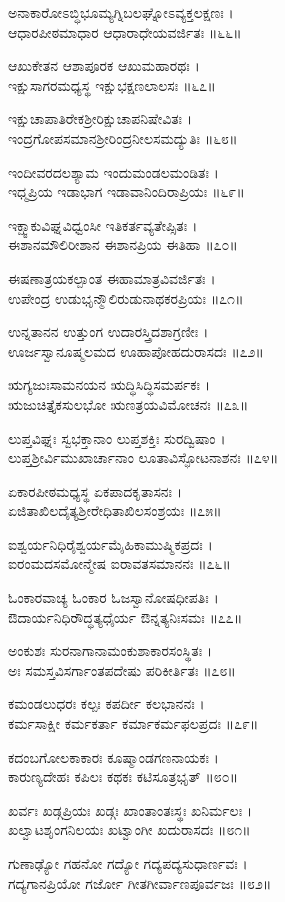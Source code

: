 ಅನಾಕಾರೋಽಬ್ಧಿಭೂಮ್ಯಗ್ನಿಬಲಘ್ನೋಽವ್ಯಕ್ತಲಕ್ಷಣಃ ।\\
ಆಧಾರಪೀಠಮಾಧಾರ ಆಧಾರಾಧೇಯವರ್ಜಿತಃ ॥೬೬॥

ಆಖುಕೇತನ ಆಶಾಪೂರಕ ಆಖುಮಹಾರಥಃ ।\\
ಇಕ್ಷುಸಾಗರಮಧ್ಯಸ್ಥ ಇಕ್ಷುಭಕ್ಷಣಲಾಲಸಃ ॥೬೭॥

ಇಕ್ಷುಚಾಪಾತಿರೇಕಶ್ರೀರಿಕ್ಷುಚಾಪನಿಷೇವಿತಃ ।\\
ಇಂದ್ರಗೋಪಸಮಾನಶ್ರೀರಿಂದ್ರನೀಲಸಮದ್ಯುತಿಃ ॥೬೮॥

ಇಂದೀವರದಲಶ್ಯಾಮ ಇಂದುಮಂಡಲಮಂಡಿತಃ ।\\
ಇಧ್ಮಪ್ರಿಯ ಇಡಾಭಾಗ ಇಡಾವಾನಿಂದಿರಾಪ್ರಿಯಃ ॥೬೯॥

ಇಕ್ಷ್ವಾಕುವಿಘ್ನವಿಧ್ವಂಸೀ ಇತಿಕರ್ತವ್ಯತೇಪ್ಸಿತಃ ।\\
ಈಶಾನಮೌಲಿರೀಶಾನ ಈಶಾನಪ್ರಿಯ ಈತಿಹಾ ॥೭೦॥

ಈಷಣಾತ್ರಯಕಲ್ಪಾಂತ ಈಹಾಮಾತ್ರವಿವರ್ಜಿತಃ ।\\
ಉಪೇಂದ್ರ ಉಡುಭೃನ್ಮೌಲಿರುಡುನಾಥಕರಪ್ರಿಯಃ ॥೭೧॥

ಉನ್ನತಾನನ ಉತ್ತುಂಗ ಉದಾರಸ್ತ್ರಿದಶಾಗ್ರಣೀಃ ।\\
ಊರ್ಜಸ್ವಾನೂಷ್ಮಲಮದ ಊಹಾಪೋಹದುರಾಸದಃ ॥೭೨॥

ಋಗ್ಯಜುಃಸಾಮನಯನ ಋದ್ಧಿಸಿದ್ಧಿಸಮರ್ಪಕಃ ।\\
ಋಜುಚಿತ್ತೈಕಸುಲಭೋ ಋಣತ್ರಯವಿಮೋಚನಃ ॥೭೩॥

ಲುಪ್ತವಿಘ್ನಃ ಸ್ವಭಕ್ತಾನಾಂ ಲುಪ್ತಶಕ್ತಿಃ ಸುರದ್ವಿಷಾಂ ।\\
ಲುಪ್ತಶ್ರೀರ್ವಿಮುಖಾರ್ಚಾನಾಂ ಲೂತಾವಿಸ್ಫೋಟನಾಶನಃ ॥೭೪॥

ಏಕಾರಪೀಠಮಧ್ಯಸ್ಥ ಏಕಪಾದಕೃತಾಸನಃ ।\\
ಏಜಿತಾಖಿಲದೈತ್ಯಶ್ರೀರೇಧಿತಾಖಿಲಸಂಶ್ರಯಃ ॥೭೫॥

ಐಶ್ವರ್ಯನಿಧಿರೈಶ್ವರ್ಯಮೈಹಿಕಾಮುಷ್ಮಿಕಪ್ರದಃ ।\\
ಐರಂಮದಸಮೋನ್ಮೇಷ ಐರಾವತಸಮಾನನಃ ॥೭೬॥

ಓಂಕಾರವಾಚ್ಯ ಓಂಕಾರ ಓಜಸ್ವಾನೋಷಧೀಪತಿಃ ।\\
ಔದಾರ್ಯನಿಧಿರೌದ್ಧತ್ಯಧೈರ್ಯ ಔನ್ನತ್ಯನಿಃಸಮಃ ॥೭೭॥

ಅಂಕುಶಃ ಸುರನಾಗಾನಾಮಂಕುಶಾಕಾರಸಂಸ್ಥಿತಃ ।\\
ಅಃ ಸಮಸ್ತವಿಸರ್ಗಾಂತಪದೇಷು ಪರಿಕೀರ್ತಿತಃ ॥೭೮॥

ಕಮಂಡಲುಧರಃ ಕಲ್ಪಃ ಕಪರ್ದೀ ಕಲಭಾನನಃ ।\\
ಕರ್ಮಸಾಕ್ಷೀ ಕರ್ಮಕರ್ತಾ ಕರ್ಮಾಕರ್ಮಫಲಪ್ರದಃ ॥೭೯॥

ಕದಂಬಗೋಲಕಾಕಾರಃ ಕೂಷ್ಮಾಂಡಗಣನಾಯಕಃ ।\\
ಕಾರುಣ್ಯದೇಹಃ ಕಪಿಲಃ ಕಥಕಃ ಕಟಿಸೂತ್ರಭೃತ್ ॥೮೦॥

ಖರ್ವಃ ಖಡ್ಗಪ್ರಿಯಃ ಖಡ್ಗಃ ಖಾಂತಾಂತಃಸ್ಥಃ ಖನಿರ್ಮಲಃ ।\\
ಖಲ್ವಾಟಶೃಂಗನಿಲಯಃ ಖಟ್ವಾಂಗೀ ಖದುರಾಸದಃ ॥೮೧॥

ಗುಣಾಢ್ಯೋ ಗಹನೋ ಗದ್ಯೋ ಗದ್ಯಪದ್ಯಸುಧಾರ್ಣವಃ ।\\
ಗದ್ಯಗಾನಪ್ರಿಯೋ ಗರ್ಜೋ ಗೀತಗೀರ್ವಾಣಪೂರ್ವಜಃ ॥೮೨॥

